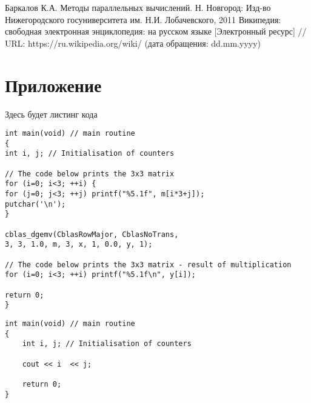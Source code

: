 \documentclass{report}
\begin{document}
\newpage

\begin{thebibliography}{1}
 Баркалов К.А. Методы параллельных вычислений. Н. Новгород: Изд-во Нижегородского госуниверситета им. Н.И. Лобачевского, 2011
 Википедия: свободная электронная энциклопедия: на русском языке [Электронный ресурс] // URL: https://ru.wikipedia.org/wiki/ (дата обращения: dd.mm.yyyy)
\end{thebibliography}
\newpage

\section*{Приложение}
Здесь будет листинг кода

\begin{lstlisting}[label=testl,caption=Test]
int main(void) // main routine
{
int i, j; // Initialisation of counters

// The code below prints the 3x3 matrix
for (i=0; i<3; ++i) {
for (j=0; j<3; ++j) printf("%5.1f", m[i*3+j]);
putchar('\n');
}

cblas_dgemv(CblasRowMajor, CblasNoTrans,
3, 3, 1.0, m, 3, x, 1, 0.0, y, 1);

// The code below prints the 3x3 matrix - result of multiplication
for (i=0; i<3; ++i) printf("%5.1f\n", y[i]);

return 0;
}
\end{lstlisting}

\begin{lstlisting}[label=test2,caption=Test2]
int main(void) // main routine
{
	int i, j; // Initialisation of counters

	cout << i  << j;

	return 0;
}
\end{lstlisting}
\end{document}
